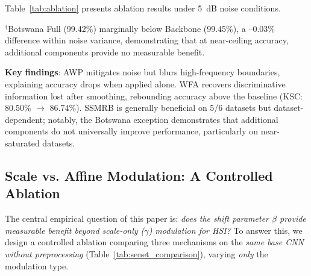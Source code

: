 \documentclass[conference]{IEEEtran}
\begin{document}
{Table~\ref{tab:ablation} presents ablation results under 5~dB noise conditions.

\begin{table}[!t]
\caption{Ablation Study Results Under 5~dB AWGN (OA \%)}
\label{tab:ablation}
\centering
{}
\begin{flushleft}
\footnotesize{$^\dagger$Botswana Full (99.42\%) marginally below Backbone (99.45\%), a --0.03\% difference within noise variance, demonstrating that at near-ceiling accuracy, additional components provide no measurable benefit.}
\end{flushleft}
\end{table}

\textbf{Key findings}: AWP mitigates noise but blurs high-frequency boundaries, explaining accuracy drops when applied alone. WFA recovers discriminative information lost after smoothing, rebounding accuracy above the baseline (KSC: 80.50\% $\to$ 86.74\%). SSMRB is generally beneficial on 5/6 datasets but dataset-dependent; notably, the Botswana exception demonstrates that additional components do not universally improve performance, particularly on near-saturated datasets.

\subsection{Scale vs. Affine Modulation: A Controlled Ablation}
\label{sec:senet_ablation}

The central empirical question of this paper is: \textit{does the shift parameter $\beta$ provide measurable benefit beyond scale-only ($\gamma$) modulation for HSI?} To answer this, we design a controlled ablation comparing three mechanisms on the \textit{same base CNN without preprocessing} (Table~\ref{tab:senet_comparison}), varying \textit{only} the modulation type.

}
\end{document}
